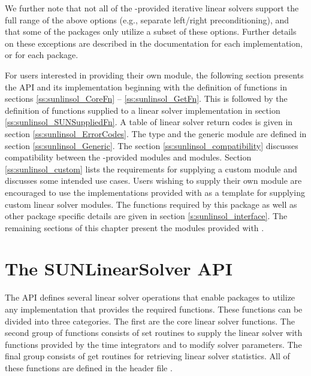 We further note that not all of the {\sundials}-provided iterative
linear solvers support the full range of the above options (e.g.,
separate left/right preconditioning), and that some of the {\sundials}
packages only utilize a subset of these options.  Further details on
these exceptions are described in the documentation for each
{\sunlinsol} implementation, or for each {\sundials} package.

For users interested in providing their own {\sunlinsol} module, the
following section presents the {\sunlinsol} API and its implementation
beginning with the definition of {\sunlinsol} functions in sections
\ref{ss:sunlinsol_CoreFn} -- \ref{ss:sunlinsol_GetFn}. This is followed by
the definition of functions supplied to a linear solver implementation in
section \ref{ss:sunlinsol_SUNSuppliedFn}. A table of linear solver return
codes is given in section \ref{ss:sunlinsol_ErrorCodes}. The
 type and the generic {\sunlinsol} module are defined
in section \ref{ss:sunlinsol_Generic}.  The section
\ref{ss:sunlinsol_compatibility} discusses compatibility between the
{\sundials}-provided {\sunlinsol} modules and {\sunmatrix} modules.
Section \ref{ss:sunlinsol_custom} lists the requirements for supplying a custom
{\sunlinsol} module and discusses some intended use cases. Users wishing to
supply their own {\sunlinsol} module are encouraged to use the {\sunlinsol}
implementations provided with {\sundials} as a template for supplying custom
linear solver modules. The {\sunlinsol} functions required by this {\sundials}
package as well as other package specific details are given in
section \ref{s:sunlinsol_interface}. The remaining sections of this chapter
present the {\sunlinsol} modules provided with {\sundials}.

\section{The SUNLinearSolver API}
\label{s:sunlinsol_api}

The {\sunlinsol} API defines several linear solver operations that enable
{\sundials} packages to utilize any {\sunlinsol} implementation that
provides the required functions. These functions can be divided into three
categories. The first are the core linear solver functions. The second group
of functions consists of set routines to supply the linear solver with
functions provided by the {\sundials} time integrators and to modify solver
parameters. The final group consists of get routines for retrieving linear
solver statistics. All of these functions are defined in the header file
.



